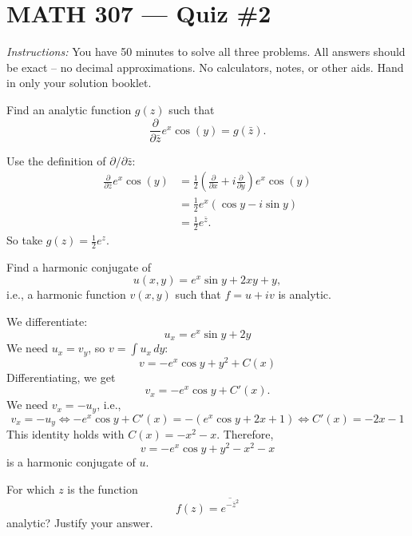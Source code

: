 \documentclass[12pt]{exam}
\begin{document}
\section*{MATH 307 --- Quiz \#2 }


\bigskip
\emph{Instructions:} You have 50 minutes to solve all three problems.
All answers should be exact -- no decimal approximations.
No calculators, notes, or other aids.
Hand in only your solution booklet. 

\bigskip
\begin{questions}
    \setlength\itemsep{2em}
    \setlength\parskip{1em}

    \question[3]
    Find an analytic function $g(z)$ such that
    \[
    \frac{\partial}{\partial \bar z}{e^x\cos(y)} = g(\bar z).
    \]
    \begin{solution}
        Use the definition of $\partial/\partial\bar z$:
        \begin{align*}
            \frac{\partial}{\partial \bar z}{e^x\cos(y)} &= 
            \frac12\left(\frac{\partial}{\partial x} + i\frac{\partial}{\partial y}\right)e^x\cos(y)\\
            &= \frac12e^x(\cos y - i\sin y)\\
            &= \frac12 e^{\bar z}.
        \end{align*}
        So take $g(z)=\frac12e^z$.
    \end{solution}


    \question[3]
    Find a harmonic conjugate of $$u(x,y) = e^x\sin y + 2xy + y,$$
    i.e., a harmonic function $v(x,y)$ such that $f=u+iv$ is analytic.
    \begin{solution}
        We differentiate:
        \[
            u_x = e^x\sin y + 2y
        \]
        We need $u_x=v_y$, so $v = \int u_x\,dy$:
        \[
            v = -e^x\cos y + y^2 + C(x)
        \]
        Differentiating, we get
        \[
            v_x = -e^x\cos y + C'(x).
        \]
        We need $v_x = -u_y$, i.e.,
        \[
            v_x = -u_y \Longleftrightarrow
            -e^x\cos y + C'(x) = -(e^x\cos y + 2x + 1)
            \Longleftrightarrow
            C'(x)=-2x-1
        \]
        This identity holds with $C(x)=-x^2-x$.
        Therefore,
        \[
            v= -e^x\cos y +  y^2 - x^2 - x
        \]
        is a harmonic conjugate of $u$.
    \end{solution}

    \question[3]
    For which $z$ is the function
    \[
        f(z) = \overline{e^{-{\bar z}^2}}
    \]
    analytic? Justify your answer.


\end{questions}
\end{document}
